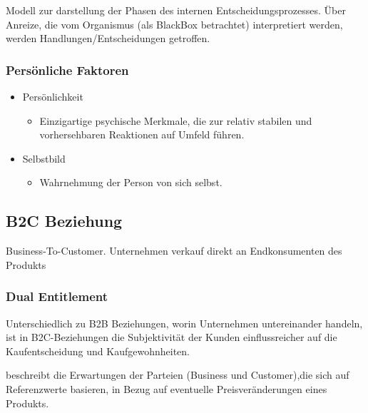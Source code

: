 \begin{definition}
     Modell zur darstellung der Phasen des internen Entscheidungsprozesses. Über Anreize, die vom Organismus (als BlackBox betrachtet) interpretiert werden, werden Handlungen/Entscheidungen getroffen.
\end{definition}

\subsubsection{Persönliche Faktoren}

\begin{itemize}
    \item Persönlichkeit
    \begin{itemize}
        \item Einzigartige psychische Merkmale, die zur relativ stabilen und vorhersehbaren Reaktionen auf Umfeld führen.
    \end{itemize}
    \item Selbstbild 
    \begin{itemize}
        \item Wahrnehmung der Person von sich selbst.
    \end{itemize}
\end{itemize}

\subsection{B2C Beziehung}

\begin{definition}
    [B2C] Business-To-Customer. Unternehmen verkauf direkt an Endkonsumenten des Produkts
\end{definition}

\subsubsection{Dual Entitlement}
Unterschiedlich zu B2B Beziehungen, worin Unternehmen untereinander handeln, ist in B2C-Beziehungen die Subjektivität der Kunden einflussreicher auf die Kaufentscheidung und Kaufgewohnheiten.
\begin{definition}
 beschreibt die Erwartungen der Parteien (Business und Customer),die sich auf Referenzwerte basieren, in Bezug auf eventuelle Preisveränderungen eines Produkts.
    
\end{definition}

